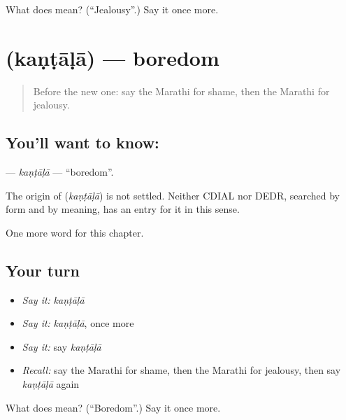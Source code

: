 \begin{tcolorbox}[breakable,colback=teal!4,colframe=teal!35!black,title={Before you move on}]
What does  mean? (\textquotedblleft{}Jealousy\textquotedblright{}.) Say it once more.
\end{tcolorbox}
\section[\texorpdfstring{\mr{कंटाळा} (kaṇṭāḷā)}{कंटाळा (kaṇṭāḷā)}]{ (kaṇṭāḷā) — boredom}

\label{lesson:MR-C170-kantala}



\begin{quote}
Before the new one: say the Marathi for shame, then the Marathi for jealousy.
\end{quote}

\subsection*{You'll want to know: }
\textbf{} — \emph{kaṇṭāḷā} — \textquotedblleft{}boredom\textquotedblright{}.

\begin{cousinweb}
The origin of \textbf{} (\emph{kaṇṭāḷā}) is not settled. Neither CDIAL nor DEDR, searched by form and by meaning, has an entry for it in this sense.
\end{cousinweb}

\begin{grammarlens}[title={What you've built}]
One more word for this chapter.
\end{grammarlens}

\subsection*{Your turn}
\begin{itemize}
\raggedright
  \item \emph{Say it:} \emph{kaṇṭāḷā}
  \item \emph{Say it:} \emph{kaṇṭāḷā}, once more
  \item \emph{Say it:} say \emph{kaṇṭāḷā}
  \item \emph{Recall:} say the Marathi for shame, then the Marathi for jealousy, then say \emph{kaṇṭāḷā} again
\end{itemize}

\begin{tcolorbox}[breakable,colback=teal!4,colframe=teal!35!black,title={Before you move on}]
What does  mean? (\textquotedblleft{}Boredom\textquotedblright{}.) Say it once more.
\end{tcolorbox}

